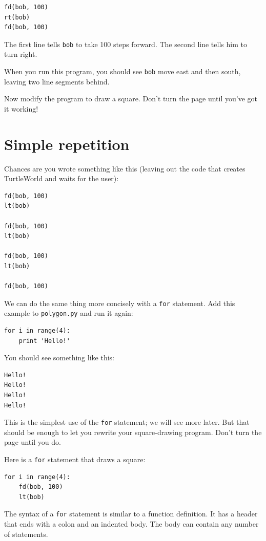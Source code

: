 \documentclass[10pt]{book}
\begin{document}
\beforeverb
\begin{verbatim}
fd(bob, 100)
rt(bob)
fd(bob, 100)
\end{verbatim}
\afterverb
%
The first line tells {\tt bob} to take 100 steps
forward.  The second line tells him to turn right.

When you run this program, you should see {\tt bob} move east and then
south, leaving two line segments behind.

Now modify the program to draw a square.  Don't turn the page until
you've got it working!

\newpage

\section{Simple repetition}
\label{repetition}

Chances are you wrote something like this (leaving out the code
that creates TurtleWorld and waits for the user):

\begin{verbatim}
fd(bob, 100)
lt(bob)

fd(bob, 100)
lt(bob)

fd(bob, 100)
lt(bob)

fd(bob, 100)
\end{verbatim}
%
We can do the same thing more concisely with a {\tt for} statement.
Add this example to {\tt polygon.py} and run it again:


\beforeverb
\begin{verbatim}
for i in range(4):
    print 'Hello!'
\end{verbatim}
\afterverb
%
You should see something like this:

\beforeverb
\begin{verbatim}
Hello!
Hello!
Hello!
Hello!
\end{verbatim}
\afterverb
%
This is the simplest use of the {\tt for} statement; we will see
more later.  But that should be enough to let you rewrite your
square-drawing program.  Don't turn the page until you do.

\newpage

Here is a {\tt for} statement that draws a square:

\beforeverb
\begin{verbatim}
for i in range(4):
    fd(bob, 100)
    lt(bob)
\end{verbatim}
\afterverb
%
The syntax of a {\tt for} statement is similar to a function
definition.  It has a header that ends with a colon and an indented
body.  The body can contain any number of statements.
\end{document}
